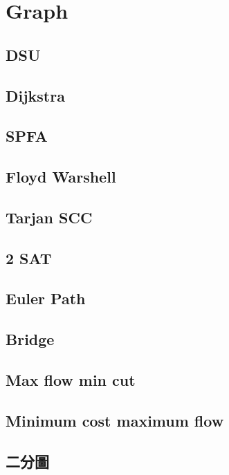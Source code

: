 \section{Graph}
\subsection{DSU} 

\subsection{Dijkstra} 

\subsection{SPFA} 

\subsection{Floyd Warshell} 

\subsection{Tarjan SCC} 

\subsection{2 SAT} 

\subsection{Euler Path}

\subsection{Bridge} 

\subsection{Max flow min cut} 

\subsection{Minimum cost maximum flow} 

\subsection{二分圖} 

